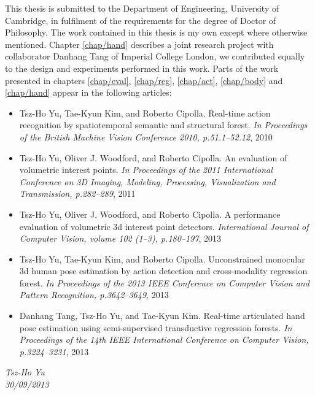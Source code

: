 	This thesis is submitted to the Department of Engineering, University of Cambridge, in fulfilment of the requirements for the degree of Doctor of Philosophy. The work contained in this thesis is my own except where otherwise mentioned. Chapter \ref{chap/hand} describes a joint research project with collaborator Danhang Tang of Imperial College London, we contributed equally to the design and experiments performed in this work. Parts of the work presented in chapters \ref{chap/eval}, \ref{chap/reg}, \ref{chap/act}, \ref{chap/body} and \ref{chap/hand} appear in the following articles:
	\begin{itemize}[]
		\item Tsz-Ho Yu, Tae-Kyun Kim, and Roberto Cipolla. Real-time action recognition by spatiotemporal semantic and structural forest. \textit{In Proceedings of the British Machine Vision Conference 2010, p.51.1--52.12}, 2010 \cite{Yu2010}
		\item Tsz-Ho Yu, Oliver J. Woodford, and Roberto Cipolla. An evaluation of volumetric interest points. \textit{In Proceedings of the 2011 International Conference on 3D Imaging, Modeling, Processing, Visualization and Transmission, p.282--289}, 2011 \cite{Yu2011}
		\item Tsz-Ho Yu, Oliver J. Woodford, and Roberto Cipolla. A performance evaluation of volumetric 3d interest point detectors. \textit{International Journal of Computer Vision, volume 102 (1--3), p.180--197}, 2013 \cite{Yu2013}
		\item Tsz-Ho Yu, Tae-Kyun Kim, and Roberto Cipolla. Unconstrained monocular 3d human pose estimation by action detection and cross-modality regression forest. \textit{In Proceedings of the 2013 IEEE Conference on Computer Vision and Pattern Recognition, p.3642--3649}, 2013 \cite{Yu2013a}
		\item Danhang Tang, Tsz-Ho Yu, and Tae-Kyun Kim. Real-time articulated hand pose estimation using semi-supervised transductive regression forests. \textit{In Proceedings of the 14th IEEE International Conference on Computer Vision, p.3224--3231}, 2013 \cite{Tang2013}
	\end{itemize}

\begin{flushright}
{\Large\textit{Tsz-Ho Yu}}\\
{\Large\textit{30/09/2013}}
\end{flushright}
